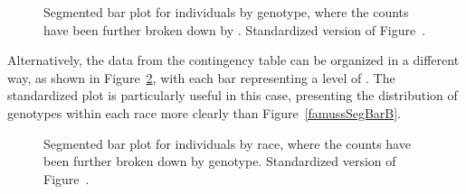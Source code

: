 \begin{doublespace}
\begin{figure}[h!]
	\centering
	\caption{ Segmented bar plot for individuals by genotype, where the counts have been further broken down by .  Standardized version of Figure~.}
	\label{famussSegBarPlotA}
\end{figure}

Alternatively, the data from the contingency table can be organized in a different way, as shown in Figure~\ref{famussSegBarPlotB}, with each bar representing a level of . The standardized plot is particularly useful in this case, presenting the distribution of genotypes within each race more clearly than Figure~\ref{famussSegBarB}.

\begin{figure}[h!]
\centering
{}
\caption{ Segmented bar plot for individuals by race, where the counts have been further broken down by genotype.  Standardized version of Figure~.}
\label{famussSegBarPlotB}
\end{figure}


\end{doublespace}
